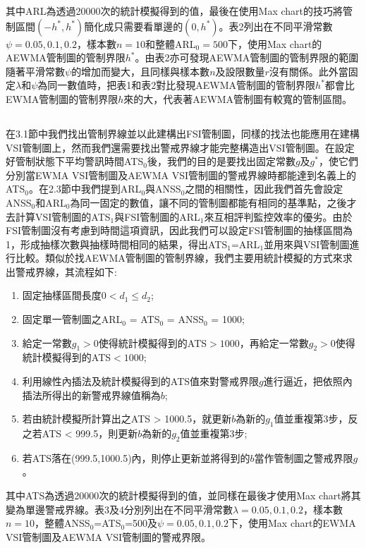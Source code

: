 \documentclass[12pt]{article}  %
\theoremstyle{plain}
\begin{document}
其中ARL為透過20000次的統計模擬得到的值，最後在使用Max chart的技巧將管制區間$(-h^*,h^*)$簡化成只需要看單邊的$(0,h^*)$。表2列出在不同平滑常數$\psi=0.05,0.1,0.2$，樣本數$n=10$和整體ARL$_0=500$下，使用Max chart的AEWMA管制圖的管制界限$h^*$。由表2亦可發現AEWMA管制圖的管制界限的範圍隨著平滑常數$\psi$的增加而變大，且同樣與樣本數$n$及設限數量$r$沒有關係。此外當固定$\lambda$和$\psi$為同一數值時，把表1和表2對比發現AEWMA管制圖的管制界限$h^*$都會比EWMA管制圖的管制界限$h$來的大，代表著AEWMA管制圖有較寬的管制區間。

\subsection{}
在3.1節中我們找出管制界線並以此建構出FSI管制圖，同樣的找法也能應用在建構VSI管制圖上，然而我們還需要找出警戒界線才能完整構造出VSI管制圖。在設定好管制狀態下平均警訊時間ATS$_0$後，我們的目的是要找出固定常數$g$及$g^*$，使它們分別當EWMA VSI管制圖及AEWMA VSI管制圖的警戒界線時都能達到名義上的ATS$_0$。在2.3節中我們提到ARL$_0$與ANSS$_0$之間的相關性，因此我們首先會設定ANSS$_0$和ARL$_0$為同一固定的數值，讓不同的管制圖都能有相同的基準點，之後才去計算VSI管制圖的ATS$_1$與FSI管制圖的ARL$_1$來互相評判監控效率的優劣。由於FSI管制圖沒有考慮到時間這項資訊，因此我們可以設定FSI管制圖的抽樣區間為1，形成抽樣次數與抽樣時間相同的結果，得出ATS$_1$=ARL$_1$並用來與VSI管制圖進行比較。類似於找AEWMA管制圖的管制界線，我們主要用統計模擬的方式來求出警戒界線，其流程如下:
\begin{enumerate}
\item 固定抽樣區間長度$0<d_1 \leq d_2$;
\item 固定單一管制圖之ARL$_0$ = ATS$_0$ = ANSS$_0$ = 1000;
\item 給定一常數$g_1 > 0$使得統計模擬得到的ATS$>1000$，再給定一常數$g_2>0$使得統計模擬得到的ATS$<1000$;
\item 利用線性內插法及統計模擬得到的ATS值來對警戒界限$g$進行逼近，把依照內插法所得出的新警戒界線值稱為$b$;
\item 若由統計模擬所計算出之ATS > 1000.5，就更新$b$為新的$g_1$值並重複第3步，反之若ATS < 999.5，則更新$b$為新的$g_2$值並重複第3步;
\item 若ATS落在(999.5,1000.5)內，則停止更新並將得到的$b$當作管制圖之警戒界限$g$。
\end{enumerate}
其中ATS為透過20000次的統計模擬得到的值，並同樣在最後才使用Max chart將其變為單邊警戒界線。表3及4分別列出在不同平滑常數$\lambda=0.05,0.1,0.2$，樣本數$n=10$，整體ANSS$_0$=ATS$_0$=500及$\psi=0.05,0.1,0.2$下，使用Max chart的EWMA VSI管制圖及AEWMA VSI管制圖的警戒界限。
\end{document}
